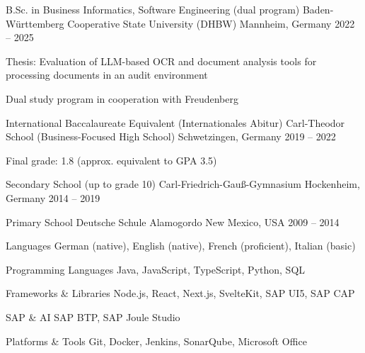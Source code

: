 \documentclass[11pt, a4paper]{awesome-cv}
\begin{document}

\begin{cventries}

\cventry
  {B.Sc. in Business Informatics, Software Engineering (dual program)}
  {Baden-Württemberg Cooperative State University (DHBW)}
  {Mannheim, Germany}
  {2022 -- 2025}
  {
    \begin{cvitems}
      \item {Thesis: Evaluation of LLM-based OCR and document analysis tools for processing documents in an audit environment}
      \item {Dual study program in cooperation with Freudenberg}
    \end{cvitems}
  }

\cventry
  {International Baccalaureate Equivalent (Internationales Abitur)}
  {Carl-Theodor School (Business-Focused High School)}
  {Schwetzingen, Germany}
  {2019 -- 2022}
  {
    \begin{cvitems}
      \item {Final grade: 1.8 (approx. equivalent to GPA 3.5)}
    \end{cvitems}
  }

\cventry
  {Secondary School (up to grade 10)}
  {Carl-Friedrich-Gauß-Gymnasium}
  {Hockenheim, Germany}
  {2014 -- 2019}
  {}

\cventry
  {Primary School}
  {Deutsche Schule Alamogordo}
  {New Mexico, USA}
  {2009 -- 2014}
  {}

\end{cventries}


\begin{cvskills}

\cvskill
{Languages}
{German (native), English (native), French (proficient), Italian (basic)}

\cvskill
{Programming Languages}
{Java, JavaScript, TypeScript, Python, SQL}

\cvskill
{Frameworks \& Libraries}
{Node.js, React, Next.js, SvelteKit, SAP UI5, SAP CAP}

\cvskill
{SAP \& AI}
{SAP BTP, SAP Joule Studio}

\cvskill
{Platforms \& Tools}
{Git, Docker, Jenkins, SonarQube, Microsoft Office}

\end{cvskills}


\begin{cvskills}


\end{cvskills}
\end{document}
